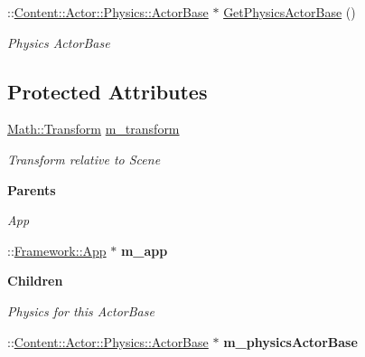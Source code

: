 \begin{DoxyCompactItemize}
\item 
\hypertarget{classContent_1_1Actor_1_1ActorBase_aba8630071648485d521a390b5b040f9d}{
::\hyperlink{classContent_1_1Actor_1_1Physics_1_1ActorBase}{Content::Actor::Physics::ActorBase} $\ast$ \hyperlink{classContent_1_1Actor_1_1ActorBase_aba8630071648485d521a390b5b040f9d}{GetPhysicsActorBase} ()}
\label{classContent_1_1Actor_1_1ActorBase_aba8630071648485d521a390b5b040f9d}

\begin{DoxyCompactList}\small\item\em Physics ActorBase \item\end{DoxyCompactList}\end{DoxyCompactItemize}
\subsection*{Protected Attributes}
\begin{DoxyCompactItemize}
\item 
\hypertarget{classContent_1_1Actor_1_1ActorBase_ab94834df0237dbbb43d545f73463c2d9}{
\hyperlink{classMath_1_1Transform}{Math::Transform} \hyperlink{classContent_1_1Actor_1_1ActorBase_ab94834df0237dbbb43d545f73463c2d9}{m\_\-transform}}
\label{classContent_1_1Actor_1_1ActorBase_ab94834df0237dbbb43d545f73463c2d9}

\begin{DoxyCompactList}\small\item\em Transform relative to Scene \item\end{DoxyCompactList}\end{DoxyCompactItemize}
\begin{Indent}{\bf Parents}\par
{\em \label{_amgrp9dafe3747e06aa15af0bfba521f66346}
 App }\begin{DoxyCompactItemize}
\item 
\hypertarget{classContent_1_1Actor_1_1ActorBase_ab88f658daf5ff3d2ceec5b3d0c8628a0}{
::\hyperlink{classFramework_1_1App}{Framework::App} $\ast$ {\bfseries m\_\-app}}
\label{classContent_1_1Actor_1_1ActorBase_ab88f658daf5ff3d2ceec5b3d0c8628a0}

\end{DoxyCompactItemize}
\end{Indent}
\begin{Indent}{\bf Children}\par
{\em \label{_amgrp64e4aca4297806247f62a7b5f8cbd3df}
 Physics for this ActorBase }\begin{DoxyCompactItemize}
\item 
\hypertarget{classContent_1_1Actor_1_1ActorBase_a04c5fd735ef30d72d39d8411c8360b4d}{
::\hyperlink{classContent_1_1Actor_1_1Physics_1_1ActorBase}{Content::Actor::Physics::ActorBase} $\ast$ {\bfseries m\_\-physicsActorBase}}
\label{classContent_1_1Actor_1_1ActorBase_a04c5fd735ef30d72d39d8411c8360b4d}

\end{DoxyCompactItemize}
\end{Indent}


